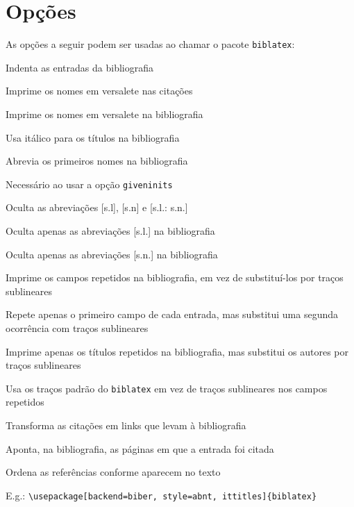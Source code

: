 \documentclass[a4paper]{article}
\begin{document}
\clearpage
\section{Opções}%
\label{sec:opções}

As opções a seguir podem ser usadas ao chamar o pacote \texttt{biblatex}:

\begin{description}[parsep=8pt,itemindent=-1em,leftmargin=3em]%
  \item [indent] Indenta as entradas da bibliografia
  \item [sccite] Imprime os nomes em versalete nas citações
  \item [scbib] Imprime os nomes em versalete na bibliografia
  \item [ittitles] Usa itálico para os títulos na bibliografia
  \item [giveninits] Abrevia os primeiros nomes na bibliografia
  \item [uniquename=init] Necessário ao usar a opção \texttt{giveninits}
  \item [noslsn] Oculta as abreviações [s.l], [s.n] e [s.l.: s.n.]
  \item [nosl] Oculta apenas as abreviações [s.l.] na bibliografia
  \item [nosn] Oculta apenas as abreviações [s.n.] na bibliografia
  \item [repeatfields] Imprime os campos repetidos na bibliografia, em vez de
    substituí-los por traços sublineares
  \item [repeatfirstfields] Repete apenas o primeiro campo de cada entrada,
    mas substitui uma segunda ocorrência com traços sublineares
  \item [repeattitles] Imprime apenas os títulos repetidos na bibliografia,
    mas substitui os autores por traços sublineares
  \item [usedashes] Usa os traços padrão do \texttt{biblatex} em vez de
    traços sublineares nos campos repetidos
  \item [hyperref] Transforma as citações em links que levam à bibliografia
  \item [backref] Aponta, na bibliografia, as páginas em que a entrada foi
    citada
  \item [sorting=none] Ordena as referências conforme aparecem no texto
\end{description}%

\vspace{\baselineskip}
E.g.: \verb"\usepackage[backend=biber, style=abnt, ittitles]{biblatex}"
\end{document}
